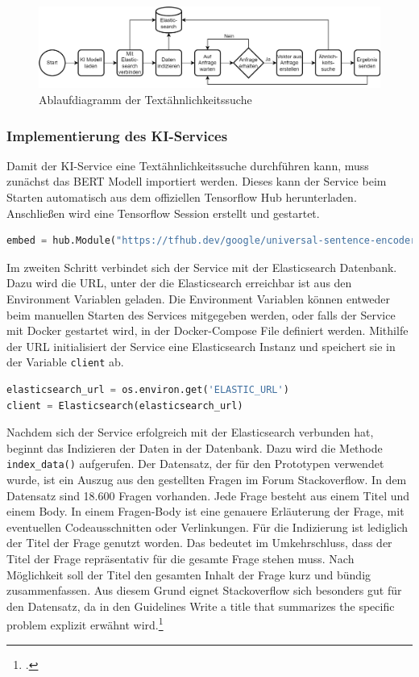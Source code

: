 \begin{figure}[H]
  \centering
    \includegraphics[width = 15cm]{bilder/KIAblauf}
    \caption{Ablaufdiagramm der Textähnlichkeitssuche}
\end{figure}

\subsubsection{Implementierung des KI-Services}
Damit der KI-Service eine Textähnlichkeitssuche durchführen kann, muss zunächst das BERT Modell importiert werden. Dieses kann der Service beim Starten automatisch aus dem offiziellen Tensorflow Hub herunterladen. Anschließen wird eine Tensorflow Session erstellt und gestartet. 

\begin{lstlisting}[language=Python]
embed = hub.Module("https://tfhub.dev/google/universal-sentence-encoder/2")
\end{lstlisting}

Im zweiten Schritt verbindet sich der Service mit der Elasticsearch Datenbank. Dazu wird die URL, unter der die Elasticsearch erreichbar ist aus den Environment Variablen geladen. Die Environment Variablen können entweder beim manuellen Starten des Services mitgegeben werden, oder falls der Service mit Docker gestartet wird, in der Docker-Compose File definiert werden. Mithilfe der URL initialisiert der Service eine Elasticsearch Instanz und speichert sie in der Variable \texttt{client} ab. 

\begin{lstlisting}[language=Python]
elasticsearch_url = os.environ.get('ELASTIC_URL')
client = Elasticsearch(elasticsearch_url)
\end{lstlisting}

Nachdem sich der Service erfolgreich mit der Elasticsearch verbunden hat, beginnt das Indizieren der Daten in der Datenbank. Dazu wird die Methode \texttt{index\_{}data()} aufgerufen. Der Datensatz, der für den Prototypen verwendet wurde, ist ein Auszug aus den gestellten Fragen im Forum Stackoverflow. In dem Datensatz sind 18.600 Fragen vorhanden. Jede Frage besteht aus einem Titel und einem Body. In einem Fragen-Body ist eine genauere Erläuterung der Frage, mit eventuellen Codeausschnitten oder Verlinkungen. Für die Indizierung ist lediglich der Titel der Frage genutzt worden. Das bedeutet im Umkehrschluss, dass der Titel der Frage repräsentativ für die gesamte Frage stehen muss. Nach Möglichkeit soll der Titel den gesamten Inhalt der Frage kurz und bündig zusammenfassen. Aus diesem Grund eignet  Stackoverflow sich besonders gut für den Datensatz, da in den Guidelines \glqq Write a title that summarizes the specific problem\grqq{} explizit erwähnt wird.\footcite{stackoverflow2022question}


